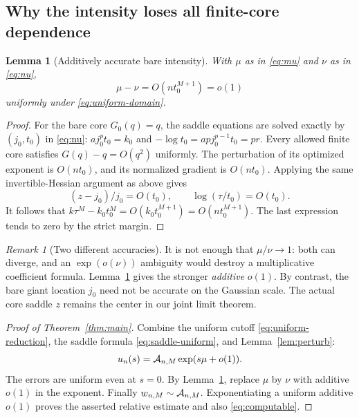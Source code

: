\documentclass[11pt,a4paper]{article}
\numberwithin{equation}{section}
\newtheorem{lemma}[theorem]{Lemma}
\theoremstyle{definition}
\theoremstyle{remark}
\newtheorem{remark}[theorem]{Remark}
\begin{document}
\subsection{Why the intensity loses all finite-core dependence}
\begin{lemma}[Additively accurate bare intensity]
\label{lem:bare}
With $\mu$ as in \eqref{eq:mu} and $\nu$ as in \eqref{eq:nu},
\begin{equation}
 \mu-\nu=O(n t_0^{M+1})=o(1)
 \label{eq:bare}
\end{equation}
uniformly under \eqref{eq:uniform-domain}.
\end{lemma}
\begin{proof}
For the bare core $G_0(q)=q$, the saddle equations are solved exactly by
$(j_0,t_0)$ in \eqref{eq:nu}: $a j_0^pt_0=k_0$ and
$-\log t_0=apj_0^{p-1}t_0=pr$.
Every allowed finite core satisfies $G(q)-q=O(q^2)$ uniformly.
The perturbation of its optimized exponent is $O(n t_0)$, and its
normalized gradient is $O(n t_0)$. Applying the same invertible-Hessian
argument as above gives
\[
 (z-j_0)/j_0=O(t_0),\qquad \log(\tau/t_0)=O(t_0).
\]
It follows that
$k\tau^M-k_0t_0^M=O(k_0t_0^{M+1})=O(n t_0^{M+1})$.
The last expression tends to zero by the strict margin.
\end{proof}

\begin{remark}[Two different accuracies]
It is not enough that $\mu/\nu\to1$: both can diverge, and an
$\exp(o(\nu))$ ambiguity would destroy a multiplicative coefficient
formula. Lemma~\ref{lem:bare} gives the stronger \emph{additive} $o(1)$.
By contrast, the bare giant location $j_0$ need not be accurate on the
Gaussian scale. The actual core saddle $z$ remains the center in our joint
limit theorem.
\end{remark}

\begin{proof}[Proof of Theorem~\ref{thm:main}]
Combine the uniform cutoff \eqref{eq:uniform-reduction}, the saddle
formula \eqref{eq:saddle-uniform}, and Lemma~\ref{lem:perturb}:
\[
 u_n(s)=\mathcal A_{n,M}\exp(s\mu+o(1)).
\]
The errors are uniform even at $s=0$. By Lemma~\ref{lem:bare}, replace
$\mu$ by $\nu$ with additive $o(1)$ in the exponent. Finally
$w_{n,M}\sim\mathcal A_{n,M}$. Exponentiating a uniform additive $o(1)$ proves
the asserted relative estimate and also \eqref{eq:computable}.
\end{proof}
\end{document}
